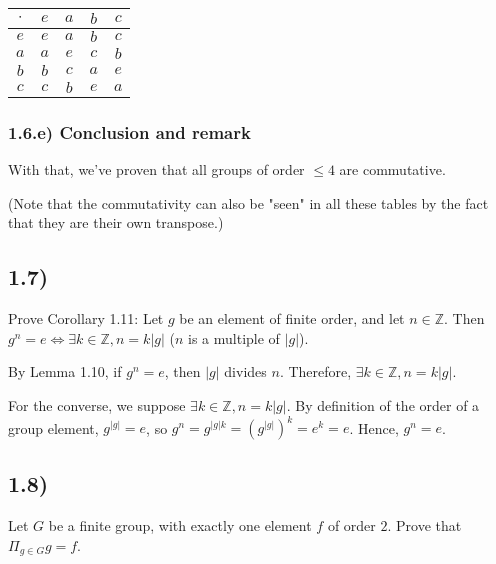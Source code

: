 \documentclass[12pt, letterpaper, twoside]{report}
\begin{document}
\begin{tabular}{|c||c|c|c|c|}
\hline
$\cdot$ & $e$ & $a$ & $b$ & $c$ \\ \hline \hline
$e    $ & $e$ & $a$ & $b$ & $c$ \\ \hline
$a    $ & $a$ & $e$ & $c$ & $b$ \\ \hline
$b    $ & $b$ & $c$ & $a$ & $e$ \\ \hline
$c    $ & $c$ & $b$ & $e$ & $a$ \\ \hline
\end{tabular}


\subsubsection*{1.6.e) Conclusion and remark}

With that, we've proven that all groups of order $\leq 4$ are commutative.

(Note that the commutativity can also be "seen" in all these tables by the fact that they are their own transpose.)



\subsection*{1.7)}

Prove Corollary 1.11: Let $g$ be an element of finite order, and let $n \in \mathbb{Z}$. Then $g^n = e \Leftrightarrow \exists k \in \mathbb{Z}, n = k|g|$ ($n$ is a multiple of $|g|$).

By Lemma 1.10, if $g^n = e$, then $|g|$ divides $n$. Therefore, $\exists k \in \mathbb{Z}, n = k|g|$.

For the converse, we suppose $\exists k \in \mathbb{Z}, n = k|g|$. By definition of the order of a group element, $g^{|g|} = e$, so $g^n = g^{|g|k} = (g^{|g|})^k = e^k = e$. Hence, $g^n = e$.



\subsection*{1.8)}


Let $G$ be a finite group, with exactly one element $f$ of order $2$. Prove that $\Pi_{g \in G} g = f$.

\end{document}
